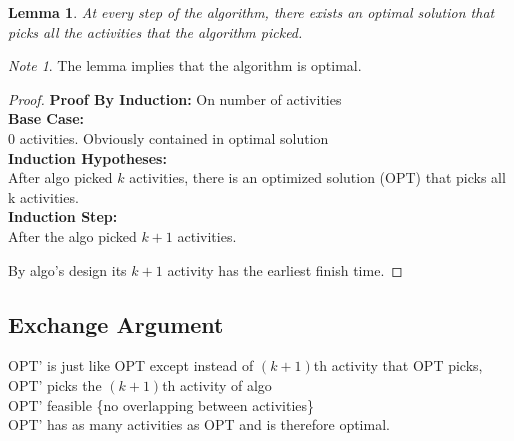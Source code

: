 \documentclass{article}
\theoremstyle{definition}
\theoremstyle{remark}
\newtheorem{note}{Note}[section]
\theoremstyle{plain}
\newtheorem{lem}[thm]{Lemma}
\begin{document}
\begin{lem}
At every step of the algorithm, there exists an optimal solution that picks all the activities that the algorithm picked.
\end{lem}

\begin{note}
The lemma implies that the algorithm is optimal.
\end{note}

\begin{proof}

\textbf{Proof By Induction:} On number of activities\\

\textbf{Base Case:}\\
$0$ activities. Obviously contained in optimal solution\\

\textbf{Induction Hypotheses:}\\ 
After algo picked $k$ activities, there is an optimized solution (OPT) that picks all k activities.\\

\textbf{Induction Step:}\\
After the algo picked $k+1$ activities.


By algo's design its $k+1$ activity has the earliest finish time.

\end{proof}

\subsection{Exchange Argument}
OPT' is just like OPT except instead of $(k+1)$th activity that OPT picks, OPT' picks the $(k+1)$th activity of algo\\
OPT' feasible \{no overlapping between activities\}\\
OPT' has as many activities as OPT and is therefore optimal.
\end{document}
